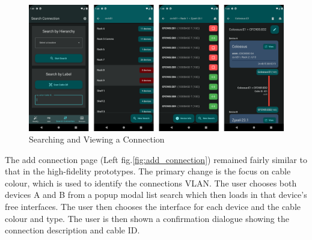 \documentclass [11pt,a4paper]{article}
\begin{document}
\begin{figure}[H]
    \centering
    \includegraphics[width=1\textwidth]{images/final_search.png}
    \caption{Searching and Viewing a Connection}
    \label{fig:search_connection}
\end{figure}

\pagebreak
The add connection page (Left fig.\ref{fig:add_connection}) remained fairly similar to that in the high-fidelity prototypes. The primary change is the focus on cable colour, which is used to identify the connections VLAN. The user chooses both devices A and B from a popup modal list search which then loads in that device's free interfaces. The user then chooses the interface for each device and the cable colour and type. The user is then shown a confirmation dialogue showing the connection description and cable ID.  
\end{document}
